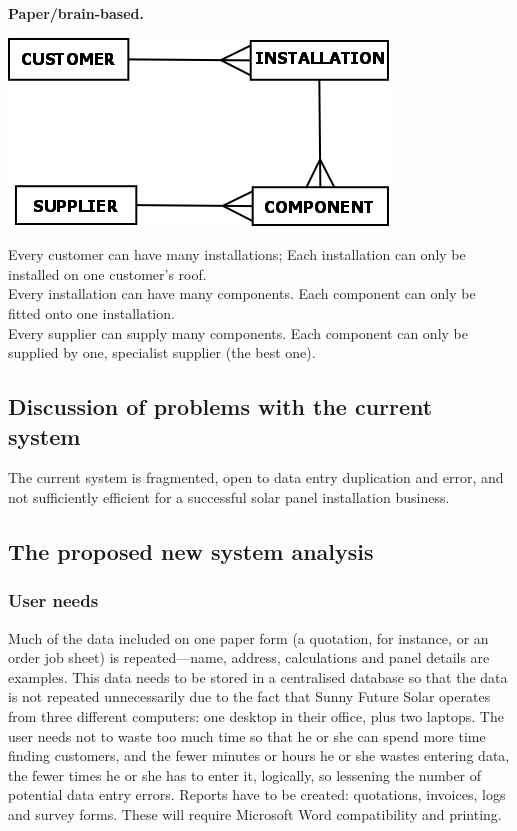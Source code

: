\textbf{Paper\slash brain-based.}

\includegraphics[scale=0.45]{erd_new}

Every customer can have many installations; Each installation can only be
installed on one customer's roof.\\
Every installation can have many components. Each component can only be
fitted onto one installation.\\
Every supplier can supply many components.  Each component can only be
supplied by one, specialist supplier (the best one).

		\subsection{Discussion of problems with the current system}
The current system is fragmented, open to data entry duplication and error, and not sufficiently efficient for a successful solar panel installation business.
		\subsection{The proposed new system analysis}
			\subsubsection{User needs}
Much of the data included on one paper form (a quotation, for instance, or an
order job sheet) is repeated---name, address, calculations and panel
details are examples.  This data needs to be stored in a centralised
database so that the data is not repeated
unnecessarily due to the fact that Sunny Future Solar operates from three
different computers: one desktop in their office, plus two laptops.  The
user needs not to waste too much time so that he or she can spend more time
finding customers, and the fewer minutes or hours he or she wastes entering data, the
fewer times he or she has to enter it, logically, so lessening the number
of potential data entry errors.  Reports have to be created: quotations, invoices, logs and survey forms.  These will require Microsoft Word compatibility and printing.
